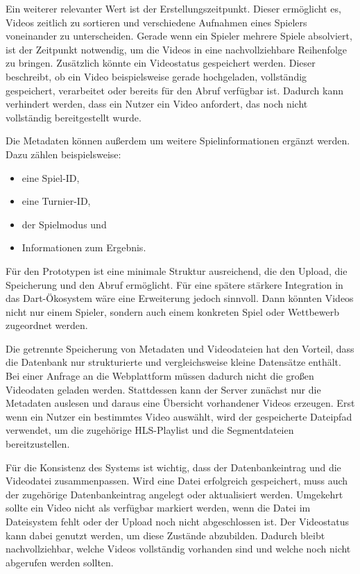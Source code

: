 Ein weiterer relevanter Wert ist der Erstellungszeitpunkt. Dieser ermöglicht es, Videos zeitlich zu sortieren und verschiedene Aufnahmen eines Spielers voneinander zu unterscheiden. Gerade wenn ein Spieler mehrere Spiele absolviert, ist der Zeitpunkt notwendig, 
um die Videos in eine nachvollziehbare Reihenfolge zu bringen. Zusätzlich könnte ein Videostatus gespeichert werden. Dieser beschreibt, ob ein Video beispielsweise gerade hochgeladen, vollständig gespeichert, verarbeitet oder bereits für den Abruf verfügbar ist. Dadurch kann verhindert werden, 
dass ein Nutzer ein Video anfordert, das noch nicht vollständig bereitgestellt wurde. 

Die Metadaten können außerdem um weitere Spielinformationen ergänzt werden. Dazu zählen beispielsweise: 

\begin{itemize} 
    \item eine Spiel-ID, 
    \item eine Turnier-ID, 
    \item der Spielmodus und 
    \item Informationen zum Ergebnis. 
\end{itemize}

Für den Prototypen ist eine minimale Struktur ausreichend, die den Upload, die Speicherung und den Abruf ermöglicht. 
Für eine spätere stärkere Integration in das Dart-Ökosystem wäre eine Erweiterung jedoch sinnvoll. Dann könnten Videos nicht nur einem Spieler, sondern auch einem konkreten Spiel oder Wettbewerb zugeordnet werden. 

Die getrennte Speicherung von Metadaten und Videodateien hat den Vorteil, dass die Datenbank nur strukturierte und vergleichsweise kleine Datensätze enthält. Bei einer Anfrage an die Webplattform müssen dadurch nicht die großen Videodaten geladen werden. 
Stattdessen kann der Server zunächst nur die Metadaten auslesen und daraus eine Übersicht vorhandener Videos erzeugen. Erst wenn ein Nutzer ein bestimmtes Video auswählt, wird der gespeicherte Dateipfad verwendet, um die zugehörige HLS-Playlist und die Segmentdateien bereitzustellen. 

Für die Konsistenz des Systems ist wichtig, dass der Datenbankeintrag und die Videodatei zusammenpassen. Wird eine Datei erfolgreich gespeichert, muss auch der zugehörige Datenbankeintrag angelegt oder aktualisiert werden. Umgekehrt sollte ein Video nicht als verfügbar markiert werden, 
wenn die Datei im Dateisystem fehlt oder der Upload noch nicht abgeschlossen ist. Der Videostatus kann dabei genutzt werden, um diese Zustände abzubilden. Dadurch bleibt nachvollziehbar, welche Videos vollständig vorhanden sind und welche noch nicht abgerufen werden sollten. 

